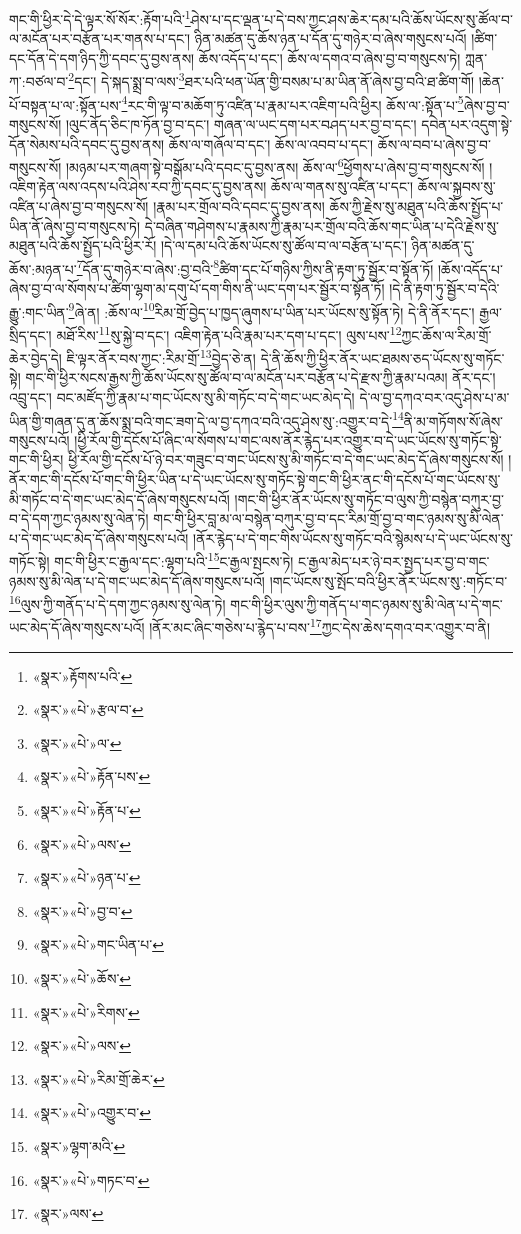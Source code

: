 གང་གི་ཕྱིར་དེ་དེ་ལྟར་སོ་སོར་:རྟོག་པའི་\footnote{«སྣར་»རྟོགས་པའི་}ཤེས་པ་དང་ལྡན་པ་དེ་བས་ཀྱང་ཤས་ཆེར་དམ་པའི་ཆོས་ཡོངས་སུ་ཚོལ་བ་ལ་མངོན་པར་བརྩོན་པར་གནས་པ་དང་། ཉིན་མཚན་དུ་ཆོས་ཉན་པ་དོན་དུ་གཉེར་བ་ཞེས་གསུངས་པའོ། །ཚིག་དང་དོན་དེ་དག་ཉིད་ཀྱི་དབང་དུ་བྱས་ནས། ཆོས་འདོད་པ་དང་། ཆོས་ལ་དགའ་བ་ཞེས་བྱ་བ་གསུངས་ཏེ། ཀླན་ཀ་:བཙལ་བ་\footnote{«སྣར་»«པེ་»རྩལ་བ་}དང་། དེ་སྐད་སྨྲ་བ་ལས་\footnote{«སྣར་»«པེ་»ལ་}ཐར་པའི་ཕན་ཡོན་གྱི་བསམ་པ་མ་ཡིན་ནོ་ཞེས་བྱ་བའི་ཐ་ཚིག་གོ། །ཆེན་པོ་བསྟན་པ་ལ་:སྟོན་པས་\footnote{«སྣར་»«པེ་»རྟོན་པས་}རང་གི་ལྟ་བ་མཆོག་ཏུ་འཛིན་པ་རྣམ་པར་འཇིག་པའི་ཕྱིར། ཆོས་ལ་:སྟོན་པ་\footnote{«སྣར་»«པེ་»རྟོན་པ་}ཞེས་བྱ་བ་གསུངས་སོ། །ལུང་ནོད་ཅིང་ཁ་ཏོན་བྱ་བ་དང་། གཞན་ལ་ཡང་དག་པར་བཤད་པར་བྱ་བ་དང་། དབེན་པར་འདུག་སྟེ་དོན་སེམས་པའི་དབང་དུ་བྱས་ནས། ཆོས་ལ་གཞོལ་བ་དང་། ཆོས་ལ་འབབ་པ་དང་། ཆོས་ལ་བབ་པ་ཞེས་བྱ་བ་གསུངས་སོ། །མཉམ་པར་གཞག་སྟེ་བསྒོམ་པའི་དབང་དུ་བྱས་ནས། ཆོས་ལ་\footnote{«སྣར་»«པེ་»ལས་}ཕྱོགས་པ་ཞེས་བྱ་བ་གསུངས་སོ། །འཇིག་རྟེན་ལས་འདས་པའི་ཤེས་རབ་ཀྱི་དབང་དུ་བྱས་ནས། ཆོས་ལ་གནས་སུ་འཛིན་པ་དང་། ཆོས་ལ་སྐྱབས་སུ་འཛིན་པ་ཞེས་བྱ་བ་གསུངས་སོ། །རྣམ་པར་གྲོལ་བའི་དབང་དུ་བྱས་ནས། ཆོས་ཀྱི་རྗེས་སུ་མཐུན་པའི་ཆོས་སྤྱོད་པ་ཡིན་ནོ་ཞེས་བྱ་བ་གསུངས་ཏེ། དེ་བཞིན་གཤེགས་པ་རྣམས་ཀྱི་རྣམ་པར་གྲོལ་བའི་ཆོས་གང་ཡིན་པ་དེའི་རྗེས་སུ་མཐུན་པའི་ཆོས་སྤྱོད་པའི་ཕྱིར་རོ། །དེ་ལ་དམ་པའི་ཆོས་ཡོངས་སུ་ཚོལ་བ་ལ་བརྩོན་པ་དང་། ཉིན་མཚན་དུ་ཆོས་:མཉན་པ་\footnote{«སྣར་»«པེ་»ཉན་པ་}དོན་དུ་གཉེར་བ་ཞེས་:བྱ་བའི་\footnote{«སྣར་»«པེ་»བྱ་བ་}ཚིག་དང་པོ་གཉིས་ཀྱིས་ནི་རྟག་ཏུ་སྦྱོར་བ་སྟོན་ཏོ། །ཆོས་འདོད་པ་ཞེས་བྱ་བ་ལ་སོགས་པ་ཚིག་ལྷག་མ་དགུ་པོ་དག་གིས་ནི་ཡང་དག་པར་སྦྱོར་བ་སྟོན་ཏོ། །དེ་ནི་རྟག་ཏུ་སྦྱོར་བ་དེའི་རྒྱུ་:གང་ཡིན་\footnote{«སྣར་»«པེ་»གང་ཡིན་པ་}ཞེ་ན། :ཆོས་ལ་\footnote{«སྣར་»«པེ་»ཆོས་}རིམ་གྲོ་བྱེད་པ་ཁྱད་ཞུགས་པ་ཡིན་པར་ཡོངས་སུ་སྟོན་ཏེ། དེ་ནི་ནོར་དང་། རྒྱལ་སྲིད་དང་། མཐོ་རིས་\footnote{«སྣར་»«པེ་»རིགས་}སུ་སྐྱེ་བ་དང་། འཇིག་རྟེན་པའི་རྣམ་པར་དག་པ་དང་། ལུས་པས་\footnote{«སྣར་»«པེ་»ལས་}ཀྱང་ཆོས་ལ་རིམ་གྲོ་ཆེར་བྱེད་དེ། ཇི་ལྟར་ནོར་བས་ཀྱང་:རིམ་གྲོ་\footnote{«སྣར་»«པེ་»རིམ་གྲོ་ཆེར་}བྱེད་ཅེ་ན། དེ་ནི་ཆོས་ཀྱི་ཕྱིར་ནོར་ཡང་ཐམས་ཅད་ཡོངས་སུ་གཏོང་སྟེ། གང་གི་ཕྱིར་སངས་རྒྱས་ཀྱི་ཆོས་ཡོངས་སུ་ཚོལ་བ་ལ་མངོན་པར་བརྩོན་པ་དེ་རྫས་ཀྱི་རྣམ་པའམ། ནོར་དང་། འབྲུ་དང་། བང་མཛོད་ཀྱི་རྣམ་པ་གང་ཡོངས་སུ་མི་གཏོང་བ་དེ་གང་ཡང་མེད་དེ། དེ་ལ་བྱ་དཀའ་བར་འདུ་ཤེས་པ་མ་ཡིན་གྱི་གཞན་དུ་ན་ཆོས་སྨྲ་བའི་གང་ཟག་དེ་ལ་བྱ་དཀའ་བའི་འདུ་ཤེས་སུ་:འགྱུར་བ་དེ་\footnote{«སྣར་»«པེ་»འགྱུར་བ་}ནི་མ་གཏོགས་སོ་ཞེས་གསུངས་པའོ། །ཕྱི་རོལ་གྱི་དངོས་པོ་ཞིང་ལ་སོགས་པ་གང་ལས་ནོར་རྙེད་པར་འགྱུར་བ་དེ་ཡང་ཡོངས་སུ་གཏོང་སྟེ་གང་གི་ཕྱིར། ཕྱི་རོལ་གྱི་དངོས་པོ་ཉེ་བར་གཟུང་བ་གང་ཡོངས་སུ་མི་གཏོང་བ་དེ་གང་ཡང་མེད་དོ་ཞེས་གསུངས་སོ། །ནོར་གང་གི་དངོས་པོ་གང་གི་ཕྱིར་ཡིན་པ་དེ་ཡང་ཡོངས་སུ་གཏོང་སྟེ་གང་གི་ཕྱིར་ནང་གི་དངོས་པོ་གང་ཡོངས་སུ་མི་གཏོང་བ་དེ་གང་ཡང་མེད་དོ་ཞེས་གསུངས་པའོ། །གང་གི་ཕྱིར་ནོར་ཡོངས་སུ་གཏོང་བ་ལུས་ཀྱི་བསྙེན་བཀུར་བྱ་བ་དེ་དག་ཀྱང་ཉམས་སུ་ལེན་ཏེ། གང་གི་ཕྱིར་བླ་མ་ལ་བསྙེན་བཀུར་བྱ་བ་དང་རིམ་གྲོ་བྱ་བ་གང་ཉམས་སུ་མི་ལེན་པ་དེ་གང་ཡང་མེད་དོ་ཞེས་གསུངས་པའོ། །ནོར་རྙེད་པ་དེ་གང་གིས་ཡོངས་སུ་གཏོང་བའི་སྙེམས་པ་དེ་ཡང་ཡོངས་སུ་གཏོང་སྟེ། གང་གི་ཕྱིར་ང་རྒྱལ་དང་:ལྷག་པའི་\footnote{«སྣར་»ལྷག་མའི་}ང་རྒྱལ་སྤངས་ཏེ། ང་རྒྱལ་མེད་པར་ཉེ་བར་སྤྱད་པར་བྱ་བ་གང་ཉམས་སུ་མི་ལེན་པ་དེ་གང་ཡང་མེད་དོ་ཞེས་གསུངས་པའོ། །གང་ཡོངས་སུ་སྤོང་བའི་ཕྱིར་ནོར་ཡོངས་སུ་:གཏོང་བ་\footnote{«སྣར་»«པེ་»གཏང་བ་}ལུས་ཀྱི་གནོད་པ་དེ་དག་ཀྱང་ཉམས་སུ་ལེན་ཏེ། གང་གི་ཕྱིར་ལུས་ཀྱི་གནོད་པ་གང་ཉམས་སུ་མི་ལེན་པ་དེ་གང་ཡང་མེད་དོ་ཞེས་གསུངས་པའོ། །ནོར་མང་ཞིང་གཅེས་པ་རྙེད་པ་བས་\footnote{«སྣར་»ལས་}ཀྱང་དེས་ཆེས་དགའ་བར་འགྱུར་བ་ནི། 